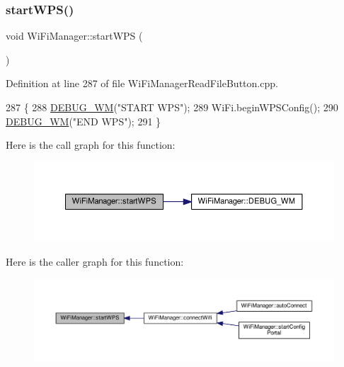 \mbox{\label{class_wi_fi_manager_abcc403fc26a47f7a111d1271f1d0869e}} 
\subsubsection{\texorpdfstring{start\+W\+P\+S()}{startWPS()}}
{\footnotesize\ttfamily void Wi\+Fi\+Manager\+::start\+W\+PS (\begin{DoxyParamCaption}{ }\end{DoxyParamCaption})\hspace{0.3cm}{\ttfamily [private]}}



Definition at line 287 of file Wi\+Fi\+Manager\+Read\+File\+Button.\+cpp.


\begin{DoxyCode}
287                            \{
288   \hyperlink{class_wi_fi_manager_ae5f595c670ccbcf9a191baf50f5c7c26}{DEBUG\_WM}(\textcolor{stringliteral}{"START WPS"});
289   WiFi.beginWPSConfig();
290   \hyperlink{class_wi_fi_manager_ae5f595c670ccbcf9a191baf50f5c7c26}{DEBUG\_WM}(\textcolor{stringliteral}{"END WPS"});
291 \}
\end{DoxyCode}
Here is the call graph for this function\+:\nopagebreak
\begin{figure}[H]
\begin{center}
\leavevmode
\includegraphics[width=350pt]{d4/dc8/class_wi_fi_manager_abcc403fc26a47f7a111d1271f1d0869e_cgraph}
\end{center}
\end{figure}
Here is the caller graph for this function\+:\nopagebreak
\begin{figure}[H]
\begin{center}
\leavevmode
\includegraphics[width=350pt]{d4/dc8/class_wi_fi_manager_abcc403fc26a47f7a111d1271f1d0869e_icgraph}
\end{center}
\end{figure}
\mbox{\label{class_wi_fi_manager_a8dfd64cefecbdf26242b16eca335c20b}} 
